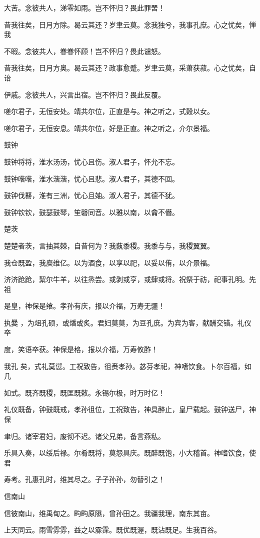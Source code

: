 大苦。念彼共人，涕零如雨。岂不怀归？畏此罪罟！

昔我往矣，日月方除。曷云其还？岁聿云莫。念我独兮，我事孔庶。心之忧矣，惮我

不暇。念彼共人，眷眷怀顾！岂不怀归？畏此谴怒。

昔我往矣，日月方奥。曷云其还？政事愈蹙。岁聿云莫，采萧获菽。心之忧矣，自诒

伊戚。念彼共人，兴言出宿。岂不怀归？畏此反覆。

嗟尔君子，无恒安处。靖共尔位，正直是与。神之听之，式穀以女。

嗟尔君子，无恒安息。靖共尔位，好是正直。神之听之，介尔景福。

鼓钟

鼓钟将将，淮水汤汤，忧心且伤。淑人君子，怀允不忘。

鼓钟喈喈，淮水湝湝，忧心且悲。淑人君子，其德不回。

鼓钟伐鼛，淮有三洲，忧心且妯。淑人君子，其德不犹。

鼓钟钦钦，鼓瑟鼓琴，笙磬同音。以雅以南，以龠不僭。

楚茨

楚楚者茨，言抽其棘，自昔何为？我蓺黍稷。我黍与与，我稷翼翼。

我仓既盈，我庾维亿。以为酒食，以享以祀，以妥以侑，以介景福。

济济跄跄，絜尔牛羊，以往烝尝。或剥或亨，或肆或将。祝祭于祊，祀事孔明。先祖

是皇，神保是飨。孝孙有庆，报以介福，万寿无疆！

执爨 ，为俎孔硕，或燔或炙。君妇莫莫，为豆孔庶。为宾为客，献酬交错。礼仪卒

度，笑语卒获。神保是格，报以介福，万寿攸酢！

我孔 矣，式礼莫愆。工祝致告，徂赉孝孙。苾芬孝祀，神嗜饮食。卜尔百福，如几

如式。既齐既稷，既匡既敕。永锡尔极，时万时亿！

礼仪既备，钟鼓既戒，孝孙徂位，工祝致告，神具醉止，皇尸载起。鼓钟送尸，神保

聿归。诸宰君妇，废彻不迟。诸父兄弟，备言燕私。

乐具入奏，以绥后禄。尔肴既将，莫怨具庆。既醉既饱，小大稽首。神嗜饮食，使君

寿考。孔惠孔时，维其尽之。子子孙孙，勿替引之！

信南山

信彼南山，维禹甸之。畇畇原隰，曾孙田之。我疆我理，南东其亩。

上天同云。雨雪雰雰，益之以霡霂。既优既渥，既沾既足。生我百谷。

